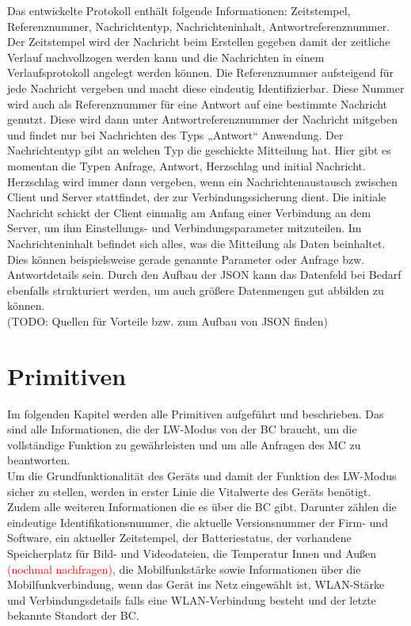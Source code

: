 \documentclass[thesis.tex]{subfiles}
\begin{document}
Das entwickelte Protokoll enthält folgende Informationen: Zeitstempel, Referenznummer, Nachrichtentyp, Nachrichteninhalt, Antwortreferenznummer.
Der Zeitstempel wird der Nachricht beim Erstellen gegeben damit der zeitliche Verlauf nachvollzogen werden kann und die
Nachrichten in einem Verlaufsprotokoll angelegt werden können.
Die Referenznummer aufsteigend für jede Nachricht vergeben und macht diese eindeutig Identifizierbar.
Diese Nummer wird auch als Referenznummer für eine Antwort auf eine bestimmte Nachricht genutzt.
Diese wird dann unter Antwortreferenznummer der Nachricht mitgeben und findet nur bei Nachrichten des Typs „Antwort“ Anwendung.
Der Nachrichtentyp gibt an welchen Typ die geschickte Mitteilung hat.
Hier gibt es momentan die Typen Anfrage, Antwort, Herzschlag und initial Nachricht.
Herzschlag wird immer dann vergeben, wenn ein Nachrichtenaustausch zwischen Client und Server stattfindet, der zur Verbindungssicherung dient.
Die initiale Nachricht schickt der Client einmalig am Anfang einer Verbindung an dem Server,
um ihm Einstellungs- und Verbindungsparameter mitzuteilen.
Im Nachrichteninhalt befindet sich alles, was die Mitteilung als Daten beinhaltet.
Dies können beispielsweise gerade genannte Parameter oder Anfrage bzw. Antwortdetails sein.
Durch den Aufbau der JSON kann das Datenfeld bei Bedarf ebenfalls strukturiert werden, um auch größere Datenmengen gut abbilden zu können.
\\

(TODO: Quellen für Vorteile bzw. zum Aufbau von JSON finden)

\section{Primitiven}
Im folgenden Kapitel werden alle Primitiven aufgeführt und beschrieben.
Das sind alle Informationen, die der LW-Modus von der BC braucht, um die vollständige Funktion zu gewährleisten
und um alle Anfragen des MC zu beantworten.
\\

Um die Grundfunktionalität des Geräts und damit der Funktion des LW-Modus sicher zu stellen, werden in erster Linie
die Vitalwerte des Geräts benötigt.
Zudem alle weiteren Informationen die es über die BC gibt.
Darunter zählen die eindeutige Identifikationsnummer, die aktuelle Versionsnummer der Firm- und Software,
ein aktueller Zeitstempel, der Batteriestatus, der vorhandene Speicherplatz für Bild- und Videodateien,
die Temperatur Innen und Außen \textcolor{red}{(nochmal nachfragen)}, die Mobilfunkstärke sowie Informationen über die Mobilfunkverbindung,
wenn das Gerät ins Netz eingewählt ist, WLAN-Stärke und Verbindungsdetails falls eine WLAN-Verbindung besteht und
der letzte bekannte Standort der BC.
\\
\end{document}

